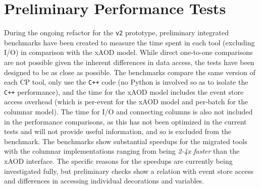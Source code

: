 \section{Preliminary Performance Tests}\label{sec:performance}

During the ongoing refactor for the \texttt{v2} prototype, preliminary integrated benchmarks have been created to measure the time spent in each tool (excluding I/O) in comparison with the xAOD model.
While direct one-to-one comparisons are not possible given the inherent differences in data access, the tests have been designed to be as close as possible.
The benchmarks compare the same version of each CP tool, only use the \texttt{C++} code (no Python is involved so as to isolate the \texttt{C++} performance), and the time for the xAOD model includes the event store access overhead (which is per-event for the xAOD model and per-batch for the columnar model).
The time for I/O and connecting columns is also not included in the performance comparisons, as this has not been optimized in the current tests and will not provide useful information, and so is excluded from the benchmark.
The benchmarks show substantial speedups for the migrated tools with the columnar implementations ranging from being \emph{2-4x faster} than the xAOD interface.
The specific reasons for the speedups are currently being investigated fully, but preliminary checks show a relation with event store access and differences in accessing individual decorations and variables.

